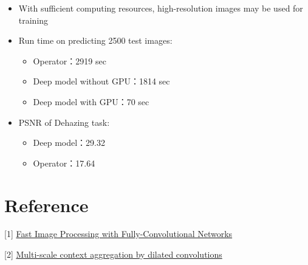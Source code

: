 \documentclass{article}
\begin{document}
\begin{itemize}
    \item With sufficient computing resources, high-resolution images may be used for training
    \item Run time on predicting 2500 test images:
    \begin{itemize}
        \item Operator：2919 sec
        \item Deep model without GPU：1814 sec
        \item Deep model with GPU：70 sec
    \end{itemize}
    \item PSNR of Dehazing task:
    \begin{itemize}
        \item Deep model：29.32
        \item Operator：17.64
    \end{itemize}
\end{itemize}

\section*{Reference}

[1] \href{http://openaccess.thecvf.com/content_ICCV_2017/papers/Chen_Fast_Image_Processing_ICCV_2017_paper.pdf}{Fast Image Processing with Fully-Convolutional Networks}

[2] \href{https://arxiv.org/pdf/1511.07122.pdf}{Multi-scale context aggregation by dilated convolutions}
\end{document}
